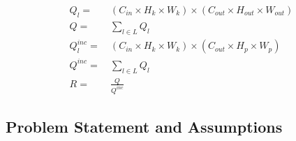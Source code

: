 \begin{align}
\label{eqn:full_local}
Q_l =&~ (C_{in} \times H_{k} \times W_{k}) \times (C_{out} \times H_{out} \times W_{out})\\
\label{eqn:full_all}
Q =&~ \sum_{l \in L} Q_l\\
\label{eqn:inc_local}
Q^{inc}_l =&~ (C_{in} \times H_{k} \times W_{k}) \times (C_{out} \times H_{p} \times W_{p})\\
\label{eqn:inc_all}
Q^{inc} =&~ \sum_{l \in L} Q_l\\
\label{eqn:redundancy_ratio}
R =&~ \frac{Q}{Q^{inc}}
\end{align}

\subsection{Problem Statement and Assumptions}